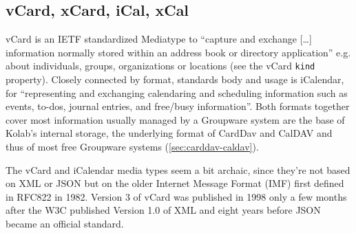 \documentclass[12pt,a4paper,twoside]{scrartcl}		%
\begin{document}


\subsection{vCard, xCard, iCal, xCal}
\label{sec:vcard-xcard-ical}

vCard is an IETF standardized Mediatype to ``capture and exchange [\ldots]
information normally stored within an address book or directory
application''\cite{RFC6350} e.g. about individuals, groups, organizations or
locations (see the vCard \lstinline:kind: property). Closely connected by
format, standards body and usage is iCalendar, for ``representing and exchanging
calendaring and scheduling information such as events, to-dos, journal entries,
and free/busy information''\cite{RFC5545}. Both formats together cover most
information usually managed by a Groupware system are the base of Kolab's
internal storage, the underlying format of CardDav and CalDAV and thus of most
free Groupware systems (\autoref{sec:carddav-caldav}).

The vCard and iCalendar media types seem a bit archaic, since they're not based
on XML or JSON but on the older Internet Message Format\cite{RFC5322} (IMF)
first defined in RFC822 in 1982. Version 3 of vCard was published in
1998\cite{RFC2425} only a few months after the W3C published Version 1.0 of
XML\cite{Paoli:98:XR} and eight years before JSON became an official
standard\cite{RFC4627}.
\end{document}
